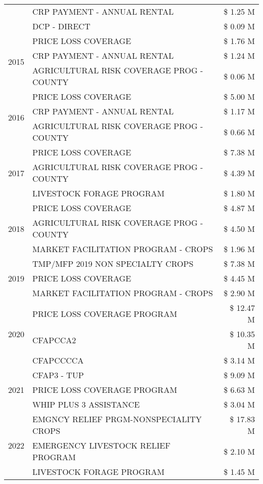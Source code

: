 \begin{tabular}{llr}
 & CRP PAYMENT - ANNUAL RENTAL & \$ 1.25 M \\
 & DCP - DIRECT & \$ 0.09 M \\
\cline{1-3}
\multirow[t]{3}{*}{2015} & PRICE LOSS COVERAGE & \$ 1.76 M \\
 & CRP PAYMENT - ANNUAL RENTAL & \$ 1.24 M \\
 & AGRICULTURAL RISK COVERAGE PROG - COUNTY & \$ 0.06 M \\
\cline{1-3}
\multirow[t]{3}{*}{2016} & PRICE LOSS COVERAGE & \$ 5.00 M \\
 & CRP PAYMENT - ANNUAL RENTAL & \$ 1.17 M \\
 & AGRICULTURAL RISK COVERAGE PROG - COUNTY & \$ 0.66 M \\
\cline{1-3}
\multirow[t]{3}{*}{2017} & PRICE LOSS COVERAGE & \$ 7.38 M \\
 & AGRICULTURAL RISK COVERAGE PROG - COUNTY & \$ 4.39 M \\
 & LIVESTOCK FORAGE PROGRAM & \$ 1.80 M \\
\cline{1-3}
\multirow[t]{3}{*}{2018} & PRICE LOSS COVERAGE & \$ 4.87 M \\
 & AGRICULTURAL RISK COVERAGE PROG - COUNTY & \$ 4.50 M \\
 & MARKET FACILITATION PROGRAM - CROPS & \$ 1.96 M \\
\cline{1-3}
\multirow[t]{3}{*}{2019} & TMP/MFP 2019 NON SPECIALTY CROPS & \$ 7.38 M \\
 & PRICE LOSS COVERAGE & \$ 4.45 M \\
 & MARKET FACILITATION PROGRAM - CROPS & \$ 2.90 M \\
\cline{1-3}
\multirow[t]{3}{*}{2020} & PRICE LOSS COVERAGE PROGRAM & \$ 12.47 M \\
 & CFAPCCA2 & \$ 10.35 M \\
 & CFAPCCCCA & \$ 3.14 M \\
\cline{1-3}
\multirow[t]{3}{*}{2021} & CFAP3 - TUP & \$ 9.09 M \\
 & PRICE LOSS COVERAGE PROGRAM & \$ 6.63 M \\
 & WHIP PLUS 3 ASSISTANCE & \$ 3.04 M \\
\cline{1-3}
\multirow[t]{3}{*}{2022} & EMGNCY RELIEF PRGM-NONSPECIALITY CROPS & \$ 17.83 M \\
 & EMERGENCY LIVESTOCK RELIEF PROGRAM & \$ 2.10 M \\
 & LIVESTOCK FORAGE PROGRAM & \$ 1.45 M \\
\cline{1-3}
\bottomrule
\end{tabular}
